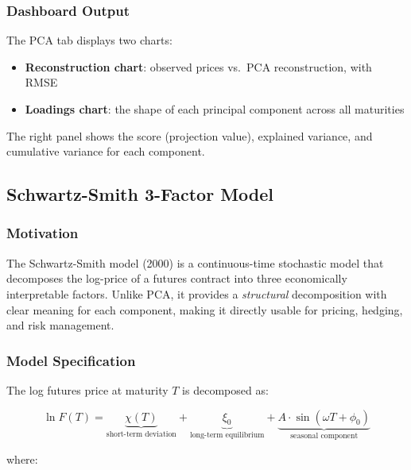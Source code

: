 \documentclass[11pt,a4paper]{article}
\begin{document}
\subsubsection{Dashboard Output}

The PCA tab displays two charts:
\begin{itemize}[itemsep=3pt]
\item \textbf{Reconstruction chart}: observed prices vs.\ PCA reconstruction, with RMSE
\item \textbf{Loadings chart}: the shape of each principal component across all maturities
\end{itemize}
The right panel shows the score (projection value), explained variance, and cumulative
variance for each component.

\subsection{Schwartz-Smith 3-Factor Model}

\subsubsection{Motivation}

The Schwartz-Smith model (2000) is a continuous-time stochastic model that decomposes the log-price of a futures contract into three economically interpretable factors. Unlike PCA, it provides a \textit{structural} decomposition with clear meaning for each component, making it directly usable for pricing, hedging, and risk management.

\subsubsection{Model Specification}

The log futures price at maturity $T$ is decomposed as:

\begin{equation}
\ln F(T) = \underbrace{\chi(T)}_{\text{short-term deviation}}
         + \underbrace{\xi_0}_{\text{long-term equilibrium}}
         + \underbrace{A \cdot \sin(\omega T + \phi_0)}_{\text{seasonal component}}
\end{equation}

where:
\end{document}
